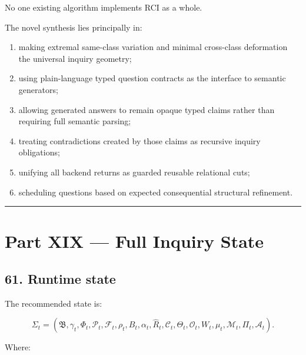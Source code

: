 \documentclass[
]{article}
\providecommand{\tightlist}{%
  \setlength{\itemsep}{0pt}\setlength{\parskip}{0pt}}
\begin{document}
No one existing algorithm implements RCI as a whole.

The novel synthesis lies principally in:

\begin{enumerate}
\def\labelenumi{\arabic{enumi}.}
\tightlist
\item
  making extremal same-class variation and minimal cross-class
  deformation the universal inquiry geometry;
\item
  using plain-language typed question contracts as the interface to
  semantic generators;
\item
  allowing generated answers to remain opaque typed claims rather than
  requiring full semantic parsing;
\item
  treating contradictions created by those claims as recursive inquiry
  obligations;
\item
  unifying all backend returns as guarded reusable relational cuts;
\item
  scheduling questions based on expected consequential structural
  refinement.
\end{enumerate}

\begin{center}\rule{0.5\linewidth}{0.5pt}\end{center}

\section{Part XIX --- Full Inquiry
State}\label{part-xix-full-inquiry-state}

\subsection{61. Runtime state}\label{runtime-state}

The recommended state is:

\[
\boxed{
\Sigma_t
=
(
\mathfrak B,
\gamma_t,
\Phi_t,
\mathcal P_t,
\mathcal F_t,
\rho_t,
B_t,
\alpha_t,
\widehat R_t,
\mathcal C_t,
\Theta_t,
\mathcal O_t,
W_t,
\mu_t,
\mathcal M_t,
\Pi_t,
\mathcal A_t
).
}
\]

Where:
\end{document}

